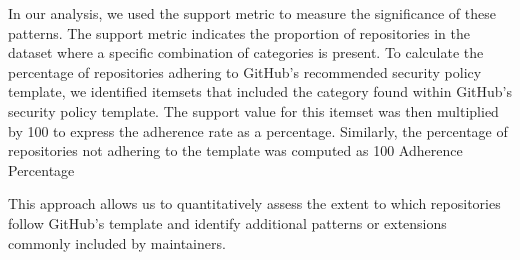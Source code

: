 In our analysis, we used the support metric to measure the significance of these patterns. The support metric indicates the proportion of repositories in the dataset where a specific combination of categories is present. To calculate the percentage of repositories adhering to GitHub's recommended security policy template, we identified itemsets that included the category found within GitHub's security policy template. The support value for this itemset was then multiplied by 100 to express the adherence rate as a percentage. Similarly, the percentage of repositories not adhering to the template was computed as 100 Adherence Percentage

This approach allows us to quantitatively assess the extent to which repositories follow GitHub's template and identify additional patterns or extensions commonly included by maintainers.




